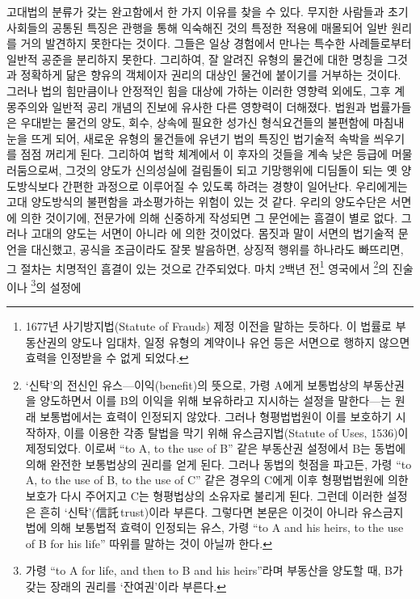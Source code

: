 고대법의 분류가 갖는 완고함에서
한 가지 이유를
찾을 수 있다.
무지한 사람들과 초기 사회들의 공통된 특징은
관행을 통해 익숙해진 것의 특정한 적용에 매몰되어
일반 원리를 거의 발견하지 못한다는 것이다.
그들은 일상 경험에서 만나는 특수한 사례들로부터
일반적 공준을 분리하지 못한다.
그리하여,
잘 알려진 유형의 물건에 대한 명칭을
그것과 정확하게 닮은 향유의 객체이자 권리의 대상인 물건에
붙이기를 거부하는 것이다.
그러나
법의 힘만큼이나 안정적인 힘을 대상에 가하는
이러한 영향력 외에도,
그후
계몽주의와 일반적 공리 개념의 진보에 유사한
다른 영향력이 더해졌다.
법원과 법률가들은
우대받는 물건의 양도, 회수, 상속에 필요한 성가신 형식요건들의
불편함에 마침내 눈을 뜨게 되어,
새로운 유형의 물건들에
유년기 법의 특징인 법기술적 속박을 씌우기를 점점 꺼리게 된다.
그리하여
법학 체계에서
이 후자의 것들을 계속 낮은 등급에 머물러둠으로써,
그것의 양도가
신의성실에 걸림돌이 되고 기망행위에 디딤돌이 되는
옛 양도방식보다 간편한 과정으로 이루어질 수 있도록
하려는 경향이 일어난다.
우리에게는 고대 양도방식의 불편함을 과소평가하는 위험이 있는 것 같다.
우리의 양도수단은 서면에 의한 것이기에,
전문가에 의해 신중하게 작성되면 그 문언에는 흠결이 별로 없다.
그러나 고대의 양도는 서면이 아니라 에 의한 것이었다.
몸짓과 말이 서면의 법기술적 문언을 대신했고,
공식을 조금이라도 잘못 발음하면,
상징적 행위를 하나라도 빠뜨리면,
그 절차는 치명적인 흠결이 있는 것으로 간주되었다.
마치 2백년 전\footnote{%
  1677년 사기방지법(Statute of Frauds) 제정 이전을 말하는 듯하다.
  이 법률로 부동산권의 양도나 임대차, 일정 유형의 계약이나 유언 등은
  서면으로 행하지 않으면 효력을 인정받을 수 없게 되었다.
  }
영국에서 \footnote{%
  `신탁'의 전신인 유스---이익(benefit)의 뜻으로,
  가령 A에게 보통법상의 부동산권을 양도하면서
  이를 B의 이익을 위해 보유하라고 지시하는 설정을 말한다---는 원래 보통법에서는
  효력이 인정되지 않았다. 그러나 형평법법원이 이를 보호하기 시작하자,
  이를 이용한 각종 탈법을 막기 위해
  유스금지법(Statute of Uses, 1536)이 제정되었다. 이로써
  ``to A, to the use of B'' 같은 부동산권 설정에서 B는 동법에 의해
  완전한 보통법상의 권리를 얻게 된다.
  그러나 동법의 헛점을 파고든, 가령
  ``to A, to the use of B, to the use of C'' 같은 경우의 C에게
  이후 형평법법원에 의한 보호가 다시 주어지고
  C는 형평법상의 소유자로 불리게 된다.
  그런데 이러한 설정은 흔히 `신탁'(信託\,trust)이라 부른다.
  그렇다면 본문은 이것이 아니라 유스금지법에 의해 보통법적 효력이
  인정되는 유스, 가령
  ``to A and his heirs, to the use of B for his life'' 따위를
  말하는 것이 아닐까 한다.
}의 진술이나
\footnote{%
  가령 ``to A for life, and then to B and his heirs''라며
  부동산을 양도할 때,
  B가 갖는 장래의 권리를 `잔여권'이라 부른다.
}의 설정에
